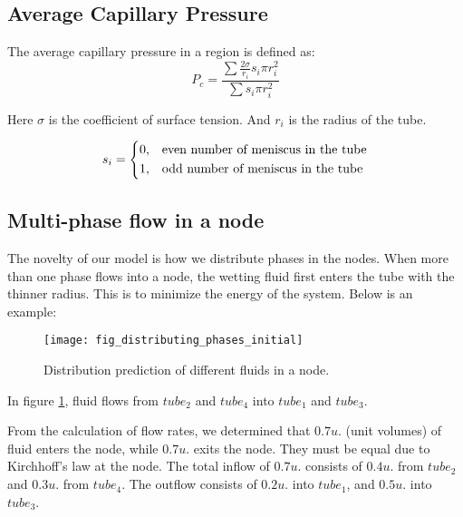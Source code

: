\subsection{Average Capillary Pressure}
	The average capillary pressure in a region is defined as:
	\begin{equation} \label{eq:average-capillary-pressure}
		P_c = \frac{\sum \frac{2 \sigma}{r_i} s_i \pi r_i^2}{\sum s_i \pi r_i^2}
	\end{equation}
	
	Here $\sigma$ is the coefficient of surface tension. And $r_i$ is the radius of the tube.
	
	\begin{equation} \label{eq:average-capillary-pressure-sign}
		s_i = 
		\begin{dcases}
			0,&\text{even number of meniscus in the tube}\\
			1,&\text{odd number of meniscus in the tube}\\
		\end{dcases}
	\end{equation}
	
\subsection{Multi-phase flow in a node} \label{sec:multi-phase-flow}
	The novelty of our model is how we distribute phases in the nodes. When more than one phase flows into a node, the wetting fluid first enters the tube with the thinner radius. This is to minimize the energy of the system. Below is an example:
	
	\begin{figure}[H]
		\centering
		\texttt{[image: fig\_distributing\_phases\_initial]}
		\caption{Distribution prediction of different fluids in a node.}
		\label{fig:distributing_phases_initial}
	\end{figure}
	
	In figure \ref{fig:distributing_phases_initial}, fluid flows from ${tube}_2$ and ${tube}_4$ into ${tube}_1$ and ${tube}_3$. 

	From the calculation of flow rates, we determined that $0.7 u.$ (unit volumes) of fluid enters the node, while $0.7 u.$ exits the node. They must be equal due to Kirchhoff's law at the node. The total inflow of $0.7 u.$ consists of $0.4 u.$ from ${tube}_2$ and $0.3 u.$ from ${tube}_4$. The outflow consists of $0.2 u.$ into ${tube}_1$, and $0.5 u.$ into ${tube}_3$.
	

